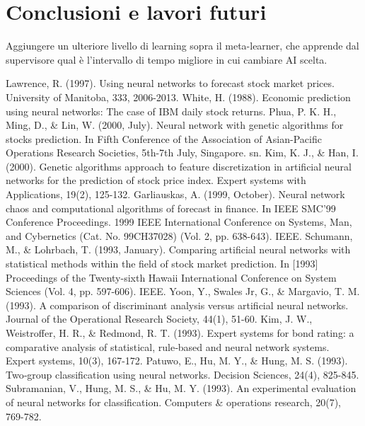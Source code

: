 \documentclass[a4paper,12pt]{report}
\begin{document}
\newpage
\chapter{Conclusioni e lavori futuri}
\label{cap5}
Aggiungere un ulteriore livello di learning sopra il meta-learner, che apprende dal supervisore qual è l'intervallo di tempo migliore in cui cambiare AI scelta.

\newpage

%
%
\begin{thebibliography}{9}
	Lawrence, R. (1997). Using neural networks to forecast stock market prices. University of Manitoba, 333, 2006-2013.
	White, H. (1988). Economic prediction using neural networks: The case of IBM daily stock returns.
	Phua, P. K. H., Ming, D., \& Lin, W. (2000, July). Neural network with genetic algorithms for stocks prediction. In Fifth Conference of the Association of Asian-Pacific Operations Research Societies, 5th-7th July, Singapore. sn.
	Kim, K. J., \& Han, I. (2000). Genetic algorithms approach to feature discretization in artificial neural networks for the prediction of stock price index. Expert systems with Applications, 19(2), 125-132.
	Garliauskas, A. (1999, October). Neural network chaos and computational algorithms of forecast in finance. In IEEE SMC'99 Conference Proceedings. 1999 IEEE International Conference on Systems, Man, and Cybernetics (Cat. No. 99CH37028) (Vol. 2, pp. 638-643). IEEE.
	Schumann, M., \& Lohrbach, T. (1993, January). Comparing artificial neural networks with statistical methods within the field of stock market prediction. In [1993] Proceedings of the Twenty-sixth Hawaii International Conference on System Sciences (Vol. 4, pp. 597-606). IEEE.
	Yoon, Y., Swales Jr, G., \& Margavio, T. M. (1993). A comparison of discriminant analysis versus artificial neural networks. Journal of the Operational Research Society, 44(1), 51-60.
	Kim, J. W., Weistroffer, H. R., \& Redmond, R. T. (1993). Expert systems for bond rating: a comparative analysis of statistical, rule‐based and neural network systems. Expert systems, 10(3), 167-172.
	Patuwo, E., Hu, M. Y., \& Hung, M. S. (1993). Two‐group classification using neural networks. Decision Sciences, 24(4), 825-845.
	Subramanian, V., Hung, M. S., \& Hu, M. Y. (1993). An experimental evaluation of neural networks for classification. Computers \& operations research, 20(7), 769-782.

\end{thebibliography}
\end{document}
